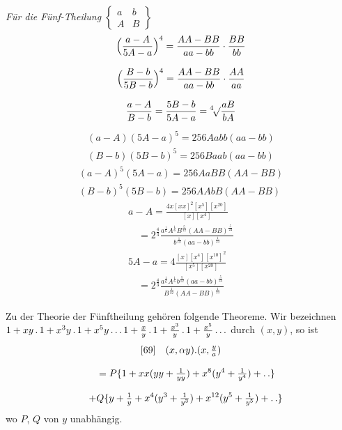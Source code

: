 \textit{Für die Fünf-Theilung}\quad
$\left\{\begin{array}{cc}a&b\\A&B\end{array}\right\}$
\[
\begin{gathered}
\Bigl(\frac{a-A}{5A-a}\Bigr)^4=\frac{AA-BB}{aa-bb}\cdot\frac{BB}{bb}\\[8pt]
\Bigl(\frac{B-b}{5B-b}\Bigr)^4=\frac{AA-BB}{aa-bb}\cdot\frac{AA}{aa}\\[8pt]
\frac{a-A}{B-b}=\frac{5B-b}{5A-a}=\mathord{{}^{4}\!\surd}{\frac{aB}{bA}}
\end{gathered}
\]
\[
\begin{gathered}
(a-A)(5A-a)^5=256Aabb(aa-bb)\\[8pt]
(B-b)(5B-b)^5=256Baab(aa-bb)
\end{gathered}
\]
\[
\begin{gathered}
(a-A)^5(5A-a)=256AaBB(AA-BB)\\[8pt]
(B-b)^5(5B-b)=256AAbB(AA-BB)
\end{gathered}
\]
\[
\begin{gathered}
a-A=\frac{4x[xx]^2[x^5][x^{20}]}{[x][x^4]}
 \\[8pt]\quad{}=2^{\frac43}\frac{a^{\frac16}A^{\frac16}B^{\frac5{12}}(AA-BB)^{\frac5{24}}}
 {b^{\frac1{12}}(aa-bb)^{\frac1{24}}}\\[1ex]
5A-a=4\frac{[x][x^4][x^{10}]^2}{[x^5][x^{20}]}
 \\[8pt]\quad{}=2^{\frac43}\frac{a^{\frac16}A^{\frac16}b^{\frac5{12}}(aa-bb)^{\frac5{24}}}
 {B^{\frac1{12}}(AA-BB)^{\frac1{24}}}
\end{gathered}
\]


Zu der Theorie der Fünftheilung gehören folgende Theoreme. Wir bezeichnen
$1+xy\,.\,1+x^3y\,.\,1+x^5y\mathinner{.\,.\,.}1+\frac xy\,.\,1+\frac{x^3}y\,.\,1+\frac{x^5}y\mathinner{.\,.\,.}$
durch $(x,y)$, so ist
\[
\begin{gathered}
[69]\quad{}
(x,\alpha y).(x,\tfrac ya)
\\[8pt]\quad{}=P\{1+xx(yy+\tfrac1{yy})+x^8(y^4+\tfrac1{y^4})+\mathinner{.\,.}\}\\[8pt]
\quad+Q\{y+\tfrac1y+x^4(y^3+\tfrac1{y^3})+x^{12}(y^5+\tfrac1{y^5})+\mathinner{.\,.}\}
\end{gathered}
\]
wo $P$, $Q$ von $y$ unabhängig.

